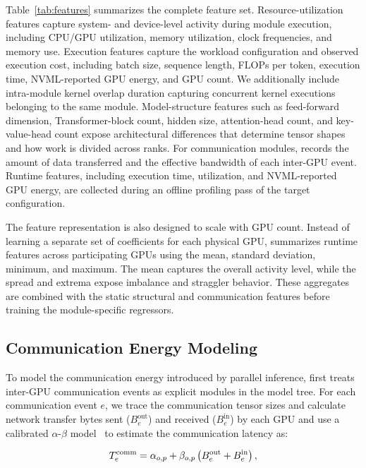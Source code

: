 Table~\ref{tab:features} summarizes the complete feature set. Resource-utilization features capture system- and device-level activity during module execution, including CPU/GPU utilization, memory utilization, clock frequencies, and memory use. Execution features capture the workload configuration and observed execution cost, including batch size, sequence length, FLOPs per token, execution time, NVML-reported GPU energy, and GPU count. We additionally include intra-module kernel overlap duration capturing concurrent kernel executions belonging to the same module. Model-structure features such as feed-forward dimension, Transformer-block count, hidden size, attention-head count, and key-value-head count expose architectural differences that determine tensor shapes and how work is divided across ranks. For communication modules, \sys{} records the amount of data transferred and the effective bandwidth of each inter-GPU event. Runtime features, including execution time, utilization, and NVML-reported GPU energy, are collected during an offline profiling pass of the target configuration.

The feature representation is also designed to scale with GPU count. Instead of learning a separate set of coefficients for each physical GPU, \sys{} summarizes runtime features across participating GPUs using the mean, standard deviation, minimum, and maximum. The mean captures the overall activity level, while the spread and extrema expose imbalance and straggler behavior. These aggregates are combined with the static structural and communication features before training the module-specific regressors.

\subsection{Communication Energy Modeling}
\label{ss:design-communication}
To model the communication energy introduced by parallel inference, \sys{} first treats inter-GPU communication events as explicit modules in the model tree. 
For each communication event $e$, we trace the communication tensor sizes and calculate network transfer bytes sent ($B_{e}^{\mathrm{out}}$) and received ($B_{e}^{\mathrm{in}}$) by each GPU and use a calibrated $\alpha$-$\beta$ model~\cite{hockney1988parallel2} to estimate the communication latency as:

\vspace{-2pt}
\begin{equation}
\label{eq:comm-latency-main}
T_{e}^{\mathrm{comm}} =
\alpha_{o,p} +
\beta_{o,p}
\left(
B_{e}^{\mathrm{out}} + B_{e}^{\mathrm{in}}
\right),
\vspace{-2pt}
\end{equation}

